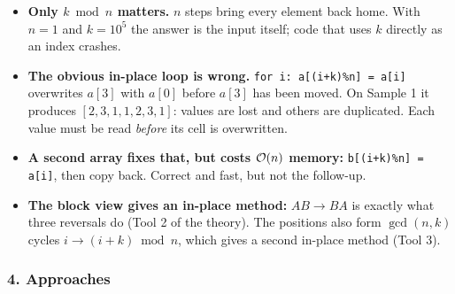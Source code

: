 \begin{itemize}[leftmargin=*]
    \item \textbf{Only $k \bmod n$ matters.} $n$ steps bring every element back home. With $n = 1$ and $k = 10^5$ the answer is the input itself; code that uses $k$ directly as an index crashes.
    \item \textbf{The obvious in-place loop is wrong.} \texttt{for i: a[(i+k)\%n] = a[i]} overwrites $a[3]$ with $a[0]$ before $a[3]$ has been moved. On Sample 1 it produces $[2,3,1,1,2,3,1]$: values are lost and others are duplicated. Each value must be read \emph{before} its cell is overwritten.
    \item \textbf{A second array fixes that, but costs $\mathcal{O}(n)$ memory:} \texttt{b[(i+k)\%n] = a[i]}, then copy back. Correct and fast, but not the follow-up.
    \item \textbf{The block view gives an in-place method:} $AB \to BA$ is exactly what three reversals do (Tool 2 of the theory). The positions also form $\gcd(n,k)$ cycles $i \to (i+k) \bmod n$, which gives a second in-place method (Tool 3).
\end{itemize}

\begin{diagrambox}
\end{diagrambox}

\subsubsection*{4. Approaches}

